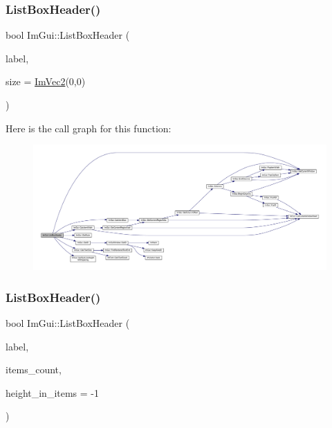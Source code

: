 \subsubsection{\texorpdfstring{List\+Box\+Header()}{ListBoxHeader()}\hspace{0.1cm}{\footnotesize\ttfamily [1/2]}}
{\footnotesize\ttfamily bool Im\+Gui\+::\+List\+Box\+Header (\begin{DoxyParamCaption}\item[{const char $\ast$}]{label,  }\item[{const \mbox{\hyperlink{struct_im_vec2}{Im\+Vec2}} \&}]{size = {\ttfamily \mbox{\hyperlink{struct_im_vec2}{Im\+Vec2}}(0,0)} }\end{DoxyParamCaption})}

Here is the call graph for this function\+:
\nopagebreak
\begin{figure}[H]
\begin{center}
\leavevmode
\includegraphics[width=350pt]{namespace_im_gui_a4003d6a6ab57f2fb43db80c6339a1aed_cgraph}
\end{center}
\end{figure}
\mbox{\label{namespace_im_gui_a6c5c48e5e5b90365f3f6faaa3307af26}} 
\subsubsection{\texorpdfstring{List\+Box\+Header()}{ListBoxHeader()}\hspace{0.1cm}{\footnotesize\ttfamily [2/2]}}
{\footnotesize\ttfamily bool Im\+Gui\+::\+List\+Box\+Header (\begin{DoxyParamCaption}\item[{const char $\ast$}]{label,  }\item[{int}]{items\+\_\+count,  }\item[{int}]{height\+\_\+in\+\_\+items = {\ttfamily -\/1} }\end{DoxyParamCaption})}

